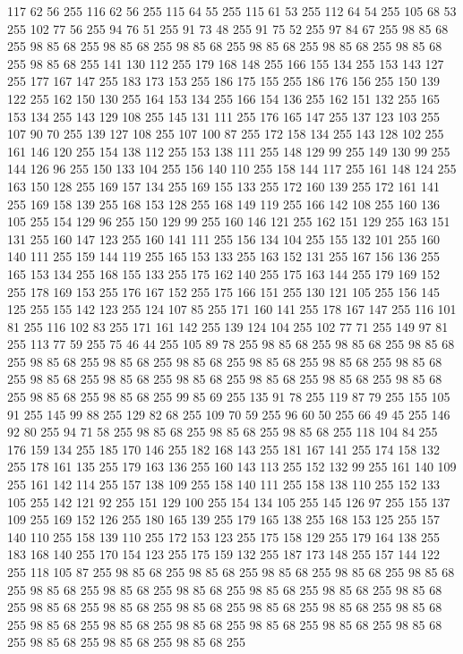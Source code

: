 117 62 56 255 116 62 56 255 115 64 55 255 115 61 53 255 112 64 54 255 105 68 53 255 102 77 56 255 94 76 51 255 91 73 48 255 91 75 52 255 97 84 67 255 98 85 68 255 98 85 68 255 98 85 68 255 98 85 68 255 98 85 68 255 98 85 68 255 98 85 68 255 98 85 68 255 141 130 112 255 179 168 148 255 166 155 134 255 153 143 127 255 177 167 147 255 183 173 153 255 186 175 155 255 186 176 156 255 150 139 122 255 162 150 130 255 164 153 134 255 166 154 136 255 162 151 132 255 165 153 134 255 143 129 108 255 145 131 111 255 176 165 147 255 137 123 103 255 107 90 70 255 139 127 108 255 107 100 87 255 172 158 134 255 143 128 102 255 161 146 120 255 154 138 112 255 153 138 111 255 148 129 99 255 149 130 99 255 144 126 96 255 150 133 104 255 156 140 110 255 158 144 117 255 161 148 124 255 163 150 128 255 169 157 134 255 169 155 133 255 172 160 139 255 172 161 141 255 169 158 139 255 168 153 128 255 168 149 119 255 166 142 108 255 160 136 105 255 154 129 96 255 150 129 99 255
160 146 121 255 162 151 129 255 163 151 131 255 160 147 123 255 160 141 111 255 156 134 104 255 155 132 101 255 160 140 111 255 159 144 119 255 165 153 133 255 163 152 131 255 167 156 136 255 165 153 134 255 168 155 133 255 175 162 140 255 175 163 144 255 179 169 152 255 178 169 153 255 176 167 152 255 175 166 151 255 130 121 105 255 156 145 125 255 155 142 123 255 124 107 85 255 171 160 141 255 178 167 147 255 116 101 81 255 116 102 83 255 171 161 142 255 139 124 104 255 102 77 71 255 149 97 81 255 113 77 59 255 75 46 44 255 105 89 78 255 98 85 68 255 98 85 68 255 98 85 68 255 98 85 68 255 98 85 68 255 98 85 68 255 98 85 68 255 98 85 68 255 98 85 68 255 98 85 68 255 98 85 68 255 98 85 68 255 98 85 68 255 98 85 68 255 98 85 68 255 98 85 68 255 98 85 68 255 99 85 69 255 135 91 78 255 119 87 79 255 155 105 91 255 145 99 88 255 129 82 68 255 109 70 59 255 96 60 50 255 66 49 45 255 146 92 80 255 94 71 58 255 98 85 68 255
98 85 68 255 98 85 68 255 118 104 84 255 176 159 134 255 185 170 146 255 182 168 143 255 181 167 141 255 174 158 132 255 178 161 135 255 179 163 136 255 160 143 113 255 152 132 99 255 161 140 109 255 161 142 114 255 157 138 109 255 158 140 111 255 158 138 110 255 152 133 105 255 142 121 92 255 151 129 100 255 154 134 105 255 145 126 97 255 155 137 109 255 169 152 126 255 180 165 139 255 179 165 138 255 168 153 125 255 157 140 110 255 158 139 110 255 172 153 123 255 175 158 129 255 179 164 138 255 183 168 140 255 170 154 123 255 175 159 132 255 187 173 148 255 157 144 122 255 118 105 87 255 98 85 68 255 98 85 68 255 98 85 68 255 98 85 68 255 98 85 68 255 98 85 68 255 98 85 68 255 98 85 68 255 98 85 68 255 98 85 68 255 98 85 68 255 98 85 68 255 98 85 68 255 98 85 68 255 98 85 68 255 98 85 68 255 98 85 68 255 98 85 68 255 98 85 68 255 98 85 68 255 98 85 68 255 98 85 68 255 98 85 68 255 98 85 68 255 98 85 68 255 98 85 68 255
